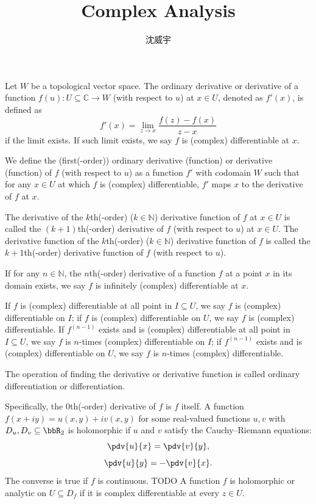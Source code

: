 \documentclass[a4paper,12pt]{article}
\begin{document}
\title{Complex Analysis}
\author{沈威宇}
\date{\temtoday}
\titletocdoc
{}
Let $W$ be a topological vector space. The ordinary derivative or derivative of a function $f(u)\colon U\subseteq\mathbb{C}\to W$ (with respect to $u$) at $x\in U$, denoted as $f'(x)$, is defined as
\[f'(x)=\lim_{z\to x}\frac{f(z)-f(x)}{z-x}\]
if the limit exists. If such limit exists, we say $f$ is (complex) differentiable at $x$.

We define the (first(-order)) ordinary derivative (function) or derivative (function) of $f$ (with respect to $u$) as a function $f'$ with codomain $W$ such that for any $x\in U$ at which $f$ is (complex) differentiable, $f'$ maps $x$ to the derivative of $f$ at $x$.

The derivative of the $k$th(-order) ($k\in\mathbb{N}$) derivative function of $f$ at $x\in U$ is called the $(k+1)$th(-order) derivative of $f$ (with respect to $u$) at $x\in U$. The derivative function of the $k$th(-order) ($k\in\mathbb{N}$) derivative function of $f$ is called the $k+1$th(-order) derivative function of $f$ (with respect to $u$).

If for any $n\in\mathbb{N}$, the $n$th(-order) derivative of a function $f$ at a point $x$ in its domain exists, we say $f$ is infinitely (complex) differentiable at $x$.

If $f$ is (complex) differentiable at all point in $I\subseteq U$, we say $f$ is (complex) differentiable on $I$; if $f$ is (complex) differentiable on $U$, we say $f$ is (complex) differentiable. If $f^{(n-1)}$ exists and is (complex) differentiable at all point in $I\subseteq U$, we say $f$ is $n$-times (complex) differentiable on $I$; if $f^{(n-1)}$ exists and is (complex) differentiable on $U$, we say $f$ is $n$-times (complex) differentiable.

The operation of finding the derivative or derivative function is called ordinary differentiation or differentiation.

Specifically, the $0$th(-order) derivative of $f$ is $f$ itself.
A function $f(x+iy)=u(x,y)+iv(x,y)$ for some real-valued functions $u,v$ with $D_u,D_v\subseteq\bbR_2$ is holomorphic if $u$ and $v$ satisfy the Cauchy–Riemann equations:
\[\pdv{u}{x}=\pdv{v}{y},\]
\[\pdv{u}{y}=-\pdv{v}{x}.\]
The converse is true if $f$ is continuous.
\bpr
TODO
\epr
{}
A function $f$ is holomorphic or analytic on $U\subseteq D_f$ if it is complex differentiable at every $z\in U$.
\end{document}
